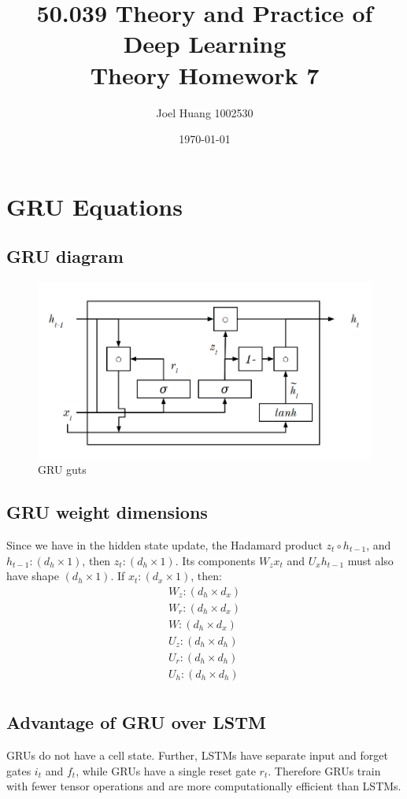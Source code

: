 \documentclass[twocolumn, 9pt]{article}
\title{
    50.039 Theory and Practice of Deep Learning\\
    Theory Homework 7
}
\author{Joel Huang 1002530}
\date{\today}
\begin{document}
\maketitle

\section{GRU Equations}
\subsection*{GRU diagram}
\begin{figure}[htbp]
    \centering
    \includegraphics[width=0.95\columnwidth]{gru.png}
    \caption{GRU guts}
    \label{fig:label}
\end{figure}
\subsection*{GRU weight dimensions}
Since we have in the hidden state update, the Hadamard product $z_t \circ h_{t-1}$, and $h_{t-1}: (d_h \times 1)$, then $z_t: (d_h \times 1)$. Its components $W_zx_t$ and $U_xh_{t-1}$ must also have shape $(d_h \times 1)$. If $x_t: (d_x \times 1)$, then:
\begin{equation*}
\begin{split}
    W_z: (d_h \times d_x)\\
    W_r: (d_h \times d_x)\\
    W: (d_h \times d_x)\\
    U_z: (d_h \times d_h)\\
    U_r: (d_h \times d_h)\\
    U_h: (d_h \times d_h)\\
\end{split}
\end{equation*}
\subsection*{Advantage of GRU over LSTM}
GRUs do not have a cell state. Further, LSTMs have separate input and forget gates $i_t$ and $f_t$, while GRUs have a single reset gate $r_t$. Therefore GRUs train with fewer tensor operations and are more computationally efficient than LSTMs.
\end{document}
